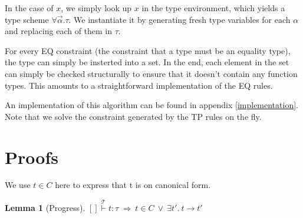 \documentclass[a4paper]{article}
\newcommand{\im}{\Rightarrow}
\newcommand{\step}{\to}
\newcommand{\T}{\mathcal{T}}
\newcommand{\stackover}[2]{\stackrel{{#2}}{#1}}
\newtheorem{lemma}{Lemma}[section]
\begin{document}
In the case of $x$, we simply look up $x$ in the type environment,
which yields a type scheme $\forall \vec{\alpha}.\tau$. We 
instantiate it by generating fresh type variables for each $\alpha$ 
and replacing each of them in $\tau$.

For every EQ constraint (the constraint that a type must be an
equality type), the type can simply be insterted into a set.
In the end, each element in the set can simply be checked 
structurally to ensure that it doesn't contain any function types.
This amounts to a straightforward implementation of the EQ rules.

An implementation of this algorithm can be found in appendix 
\ref{implementation}. Note that we solve the constraint generated
by the TP rules on the fly.

\section{Proofs}
\label{sec:proofs}

We use $t \in C$ here to express that t is on canonical form.

\begin{lemma}[Progress]
\label{lemma:progress}
$\stackover{[]\vdash t:\tau}{\T}\ \im\ t \in C\  \lor\  \exists t'.\ t\step t'$
\end{lemma}
\end{document}
